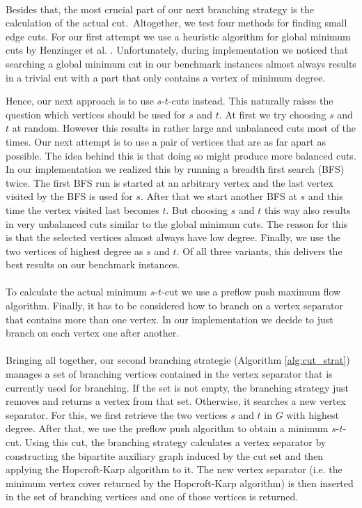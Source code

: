 \documentclass[]{article}
\begin{document}
\paragraph{}
Besides that, the most crucial part of our next branching strategy is the calculation of the actual cut.~Altogether, we test four methods for finding small edge cuts. For our first attempt we use a heuristic algorithm for global minimum cuts by Henzinger et al. \cite{bibid}. Unfortunately, during implementation we noticed that searching a global minimum cut in our benchmark instances almost always results in a trivial cut with a part that only contains a vertex of minimum degree.

Hence, our next approach is  to use $s$-$t$-cuts instead. This naturally raises the question which vertices should be used for $s$ and $t$. At first we try choosing $s$ and $t$ at random. However this results in rather large and unbalanced cuts most of the times. Our next attempt is to use a pair of vertices that are as far apart as possible. The idea behind this is that doing so might produce more balanced cuts. In our implementation we realized this by running a breadth first search (BFS) twice. The first BFS run is started at an arbitrary vertex and the last vertex visited by the BFS is used for $s$. After that we start another BFS at $s$ and this time the vertex visited last becomes $t$. But choosing $s$ and $t$ this way also results in very unbalanced cuts similar to the global minimum cuts. The reason for this is that the selected vertices almost always have low degree. Finally, we use the two vertices of highest degree as $s$ and $t$. Of all three variants, this delivers the best results on our benchmark instances.

\paragraph{}
To calculate the actual minimum $s$-$t$-cut we use a preflow push maximum flow algorithm. Finally, it has to be considered how to branch on a vertex separator that contains more than one vertex. In our implementation we decide to just branch on each vertex one after another.
\paragraph{}
Bringing all together, our second branching strategie (Algorithm \ref{alg:cut_strat}) manages a set of branching vertices contained in the vertex separator that is currently used for branching. If the set is not empty, the branching strategy just removes and returns a vertex from that set. Otherwise, it searches a new vertex separator. For this, we first retrieve the two vertices $s$ and $t$ in $G$ with highest degree. After that, we use the preflow push algorithm to obtain a minimum $s$-$t$-cut. Using this cut, the branching strategy calculates a vertex separator by constructing the bipartite auxiliary graph induced by the cut set and then applying the Hopcroft-Karp algorithm to it. The new vertex separator (i.e. the minimum vertex cover returned by the Hopcroft-Karp algorithm) is then inserted in the set of branching vertices and one of those vertices is returned.
\end{document}
